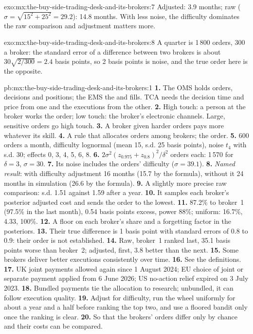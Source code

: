 \begin{solution}{exo:mx:the-buy-side-trading-desk-and-its-brokers:7}
Adjusted: 3.9 months; raw ($\sigma=\sqrt{15^2+25^2}=29.2$): 14.8 months. With less noise, the difficulty dominates the raw comparison and adjustment
matters more.
\end{solution}

\begin{solution}{exo:mx:the-buy-side-trading-desk-and-its-brokers:8}
A quarter is 1\,800 orders, 300 a broker: the standard error of a difference between two brokers is about $30\sqrt{2/300}=2.4$ basis points, so 2
basis points is noise, and the true order here is the opposite.
\end{solution}

\begin{solution}{pb:mx:the-buy-side-trading-desk-and-its-brokers:1}
\textbf{1.} The OMS holds orders, decisions and positions; the EMS the  and fills. TCA needs the decision time and price from one and the
executions from the other.
\textbf{2.} High touch: a person at the broker works the order; low touch: the broker's electronic channels. Large, sensitive orders go high touch.
\textbf{3.} A broker given harder orders pays more whatever its skill.
\textbf{4.} A rule that allocates orders among brokers; the order.
\textbf{5.} 600 orders a month, difficulty lognormal (mean 15, s.d. 25 basis points), noise $t_4$ with s.d. 30; effects 0, 3, 4, 5, 6, 8.
\textbf{6.} $2\sigma^2(z_{0.975}+z_{0.8})^2/\delta^2$ orders each: 1\,570 for $\delta=3$, $\sigma=30$.
\textbf{7.} Its noise includes the orders' difficulty ($\sigma=39.1$).
\textbf{8.} \emph{Named result}: with difficulty adjustment 16 months (15.7 by the formula), without it 24 months in simulation (26.6 by the formula).
\textbf{9.} A slightly more precise raw comparison: s.d. 1.51 against 1.59 after a year.
\textbf{10.} It samples each broker's posterior adjusted cost and sends the order to the lowest.
\textbf{11.} 87.2\% to broker~1 (97.5\% in the last month), 0.54 basis points excess, power 88\%; uniform: 16.7\%, 4.33, 100\%.
\textbf{12.} A floor on each broker's share and a forgetting factor in the posteriors.
\textbf{13.} Their true difference is 1 basis point with standard errors of 0.8 to 0.9: their order is not established.
\textbf{14.} Raw, broker~1 ranked last, 35.1 basis points worse than broker~2; adjusted, first, 3.8 better than the next.
\textbf{15.} Some brokers deliver better executions consistently over time.
\textbf{16.} See the definitions.
\textbf{17.} UK joint payments allowed again since 1 August 2024; EU choice of joint or separate payment applied from 6 June 2026; US no-action relief
expired on 3 July 2023.
\textbf{18.} Bundled payments tie the allocation to research; unbundled, it can follow execution quality.
\textbf{19.} Adjust for difficulty, run the wheel uniformly for about a year and a half before ranking the top two, and use a floored bandit only once
the ranking is clear.
\textbf{20.} So that the brokers' orders differ only by chance and their costs can be compared.
\end{solution}

